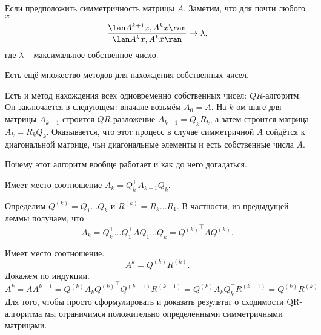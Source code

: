Если предположить симметричность матрицы $A$. Заметим, что  для почти любого $x$ 
$$\frac {\lan A^{k+1}x, A^k x \ran}{\lan A^k x, A^k x \ran} \to \lambda, $$
где $\lambda$ -- максимальное собственное число.

Есть ещё множество методов для нахождения собственных чисел. 

Есть и метод нахождения всех одновременно собственных чисел: $QR$-алгоритм. Он заключается в следующем: вначале возьмём $A_0=A$. На $k$-ом шаге для матрицы $A_{k-1}$ строится $QR$-разложение $A_{k-1}=Q_kR_k$, а затем строится матрица $A_k=R_kQ_k$. Оказывается, что этот процесс в случае симметричной $A$ сойдётся к диагональной матрице, чьи диагональные элементы  и есть собственные числа $A$. 

Почему этот алгоритм вообще работает и как до него догадаться.

\lm Имеет место соотношение $A_k=Q_k^\top A_{k-1} Q_k$.
\elm

Определим $Q^{(k)}=Q_1\dots Q_k$ и $R^{(k)}= R_k \dots R_1$. В частности, из предыдущей леммы получаем, что $$A_k=Q_k^\top \dots Q_1^\top A Q_1 \dots Q_k= {Q^{(k)}}^\top A Q^{(k)}.$$

\lm  Имеет место соотношение. 
$$A^k=Q^{(k)}R^{(k)}.$$
\elm
\proof Докажем по индукции. 
$$A^k=A A^{k-1}= Q^{(k)}A_k{Q^{(k)}}^\top Q^{(k-1)}R^{(k-1)} = Q^{(k)}A_k Q_k^\top R^{(k-1)}=Q^{(k)} R^{(k)}$$
\endproof
Для того, чтобы просто сформулировать и доказать результат о сходимости QR-алгоритма мы ограничимся положительно определёнными симметричными матрицами.

